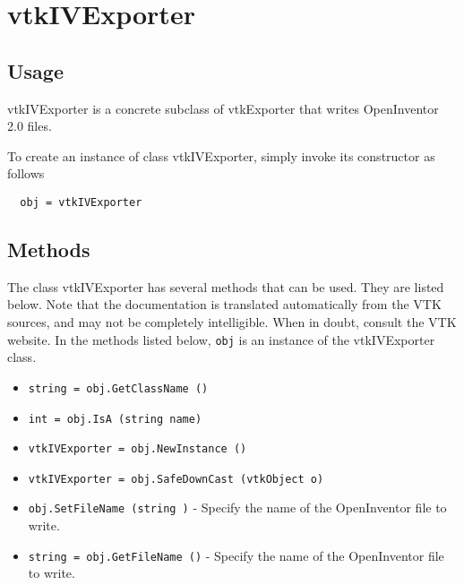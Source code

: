 \section{vtkIVExporter}

\subsection{Usage}

 vtkIVExporter is a concrete subclass of vtkExporter that writes
 OpenInventor 2.0 files.


To create an instance of class vtkIVExporter, simply
invoke its constructor as follows
\begin{verbatim}
  obj = vtkIVExporter
\end{verbatim}
\subsection{Methods}

The class vtkIVExporter has several methods that can be used.
  They are listed below.
Note that the documentation is translated automatically from the VTK sources,
and may not be completely intelligible.  When in doubt, consult the VTK website.
In the methods listed below, \verb|obj| is an instance of the vtkIVExporter class.
\begin{itemize}
\item  \verb|string = obj.GetClassName ()|

\item  \verb|int = obj.IsA (string name)|

\item  \verb|vtkIVExporter = obj.NewInstance ()|

\item  \verb|vtkIVExporter = obj.SafeDownCast (vtkObject o)|

\item  \verb|obj.SetFileName (string )| -  Specify the name of the OpenInventor file to write.

\item  \verb|string = obj.GetFileName ()| -  Specify the name of the OpenInventor file to write.

\end{itemize}
